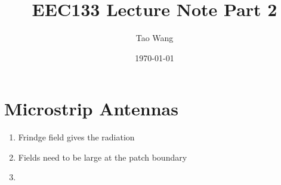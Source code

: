 \documentclass{article} %
\begin{document}
\title{EEC133 Lecture Note Part 2}
\author{Tao Wang}
\date{\today}

\maketitle

\section{Microstrip Antennas}
\begin{enumerate}
    \item Frindge field gives the radiation
    \item Fields need to be large at the patch boundary
    \item
\end{enumerate}
\end{document}
